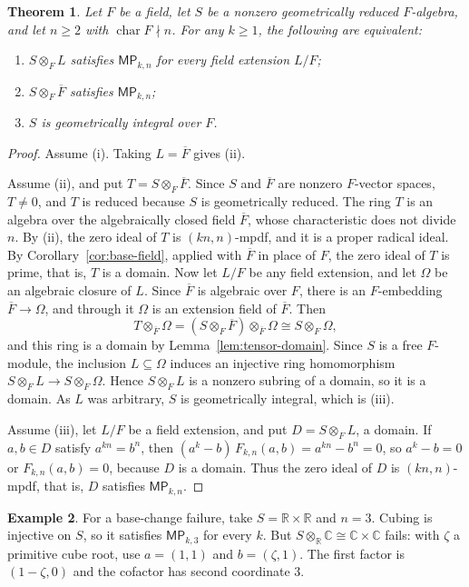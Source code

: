 \documentclass[11pt,a4paper]{amsart}
\newtheorem{theorem}{Theorem}[section]
\theoremstyle{definition}
\newtheorem{example}[theorem]{Example}
\theoremstyle{remark}
\newcommand{\MP}[2]{\mathsf{MP}_{#1,#2}}
\numberwithin{equation}{section}
\begin{document}
\begin{theorem}\label{thm:geometric}
Let $F$ be a field, let $S$ be a nonzero geometrically reduced
$F$-algebra, and let $n\ge2$ with
$\operatorname{char}F\nmid n$.  For any $k\ge1$, the following
are equivalent:
\begin{enumerate}
\item $S\otimes_F L$ satisfies $\MP{k}{n}$ for every field
extension $L/F$;
\item $S\otimes_F\overline F$ satisfies $\MP{k}{n}$;
\item $S$ is geometrically integral over $F$.
\end{enumerate}
\end{theorem}
\begin{proof}
Assume (i).
Taking $L=\overline F$ gives (ii).

Assume (ii), and put $T=S\otimes_F\overline F$.
Since $S$ and $\overline F$ are nonzero $F$-vector spaces, $T\neq0$, and $T$ is reduced because $S$ is geometrically reduced.
The ring $T$ is an algebra over the algebraically closed field $\overline F$, whose characteristic does not divide $n$.
By (ii), the zero ideal of $T$ is $(kn,n)$-mpdf, and it is a proper radical ideal.
By Corollary~\ref{cor:base-field}, applied with $\overline F$ in place of $F$, the zero ideal of $T$ is prime, that is, $T$ is a domain.
Now let $L/F$ be any field extension, and let $\Omega$ be an algebraic closure of $L$.
Since $\overline F$ is algebraic over $F$, there is an $F$-embedding $\overline F\to\Omega$, and through it $\Omega$ is an extension field of $\overline F$.
Then
\[ T\otimes_{\overline F}\Omega=(S\otimes_F\overline F)\otimes_{\overline F}\Omega\cong S\otimes_F\Omega, \]
and this ring is a domain by Lemma~\ref{lem:tensor-domain}.
Since $S$ is a free $F$-module, the inclusion $L\subseteq\Omega$ induces an injective ring homomorphism $S\otimes_F L\to S\otimes_F\Omega$.
Hence $S\otimes_F L$ is a nonzero subring of a domain, so it is a domain.
As $L$ was arbitrary, $S$ is geometrically integral, which is (iii).

Assume (iii), let $L/F$ be a field extension, and put $D=S\otimes_F L$, a domain.
If $a,b\in D$ satisfy $a^{kn}=b^n$, then $(a^k-b)\,F_{k,n}(a,b)=a^{kn}-b^n=0$,
so $a^k-b=0$ or $F_{k,n}(a,b)=0$, because $D$ is a domain.
Thus the zero ideal of $D$ is $(kn,n)$-mpdf, that is, $D$ satisfies $\MP{k}{n}$.
\end{proof}


\begin{example}\label{ex:base-change}
For a base-change failure, take $S=\mathbb R\times\mathbb R$ and
$n=3$.  Cubing is injective on $S$, so it satisfies
$\MP{k}{3}$ for every $k$.  But
$S\otimes_{\mathbb R}\mathbb C\cong\mathbb C\times\mathbb C$
fails: with $\zeta$ a primitive cube root, use $a=(1,1)$ and
$b=(\zeta,1)$.  The first factor is $(1-\zeta,0)$ and the cofactor
has second coordinate $3$.
\end{example}
\end{document}
